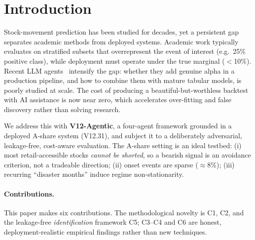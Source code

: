 \documentclass[sigconf,nonacm]{acmart}
\begin{document}

\maketitle

\section{Introduction}\label{sec:intro}

Stock-movement prediction has been studied for decades, yet a persistent gap
separates academic methods from deployed systems. Academic work typically evaluates
on stratified subsets that overrepresent the event of interest (e.g.\ 25\% positive
class), while deployment must operate under the true marginal ($<$10\%). Recent LLM
agents~\cite{yu2024finagent,hu2024alphaforge,li2024tradinggpt} intensify the gap:
whether they add genuine alpha in a production pipeline, and how to combine them with
mature tabular models, is poorly studied at scale. The cost of producing a
beautiful-but-worthless backtest with AI assistance is now near zero, which
accelerates over-fitting and false discovery rather than solving research.

We address this with \textbf{V12-Agentic}, a four-agent framework grounded in a
deployed A-share system (V12.31), and subject it to a deliberately adversarial,
leakage-free, cost-aware evaluation. The A-share setting is an ideal testbed:
(i) most retail-accessible stocks \emph{cannot be shorted}, so a bearish signal is an
avoidance criterion, not a tradeable direction; (ii) onset events are sparse
($\approx 8\%$); (iii) recurring ``disaster months'' induce regime non-stationarity.

\paragraph{Contributions.} This paper makes six contributions. The methodological
novelty is C1, C2, and the leakage-free \emph{identification} framework C5; C3--C4
and C6 are honest, deployment-realistic empirical findings rather than new techniques.
\end{document}
